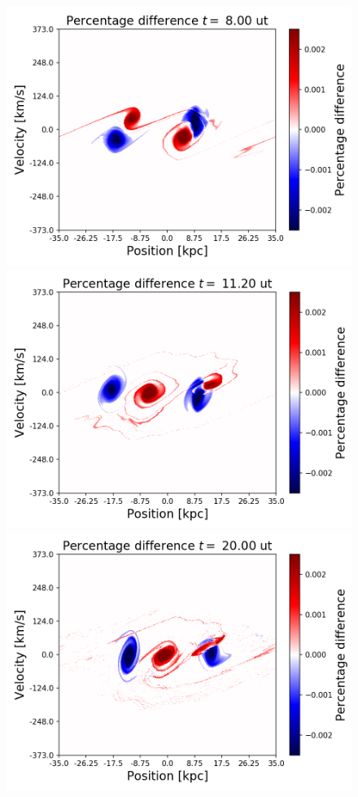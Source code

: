 {\begin{figure}[h!]
    \centering
    \includegraphics[scale=0.45]{imag/diffBullet20.png}
    \includegraphics[scale=0.45]{imag/diffBullet28.png}
    \includegraphics[scale=0.45]{imag/diffBullet50.png}

\end{figure}}
